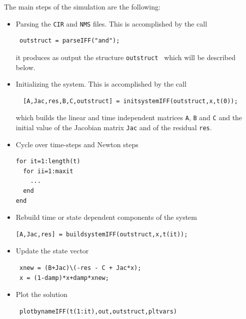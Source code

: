 \documentclass{scrartcl}
\newcommand{\cir}{{\tt CIR}}
\newcommand{\nms}{{\tt NMS}}
\begin{document}
The main steps of the simulation are the following:

\begin{itemize}
\item Parsing the {\cir} and {\nms} files. This is accomplished by the call
\begin{lstlisting}
 outstruct = parseIFF("and");
\end{lstlisting}
it produces as output the structure {\tt outstruct } which will be described below.
\item Initializing the system. This is accomplished by the call
\begin{lstlisting}
  [A,Jac,res,B,C,outstruct] = initsystemIFF(outstruct,x,t(0));
\end{lstlisting}
which builds the linear and time independent matrices  {\tt A},  {\tt B} 
and  {\tt C} and the initial value
of the Jacobian matrix  {\tt Jac} and of the residual  {\tt res}.
\item Cycle over time-steps and Newton steps
\begin{lstlisting}
for it=1:length(t) 
  for ii=1:maxit
    ...
  end
end
\end{lstlisting}
\item Rebuild time or state dependent components of the system
\begin{lstlisting}
[A,Jac,res] = buildsystemIFF(outstruct,x,t(it));
\end{lstlisting}
\item Update the state vector 
\begin{lstlisting}
 xnew = (B+Jac)\(-res - C + Jac*x);
 x = (1-damp)*x+damp*xnew;
\end{lstlisting}
\item Plot the solution
\begin{lstlisting}
 plotbynameIFF(t(1:it),out,outstruct,pltvars)
\end{lstlisting}
\end{itemize}
\end{document}
